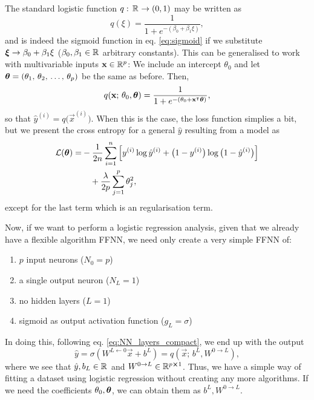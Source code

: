 The standard logistic function $q:\, \RR \to (0,1)$ may be written as 
\begin{equation}\label{eq:logistic_function}
    q(\xi) = \frac{1}{1+e^{-(\beta_0 + \beta_1\xi)}},
\end{equation}
and is indeed the sigmoid function in eq. \eqref{eq:sigmoid} if we substitute $\svec{\xi} \to \beta_0 + \beta_1 \xi$ ($\beta_0, \beta_1 \in \RR$ arbitrary constants). This can be generalised to work with multivariable inputs $\vec{x}\in \RR[p]$: We include an intercept $\theta_0$ and let $\svec{\theta} = (\theta_1, \, \theta_2, \, \dots,\, \theta_p)$ be the same as before. Then,
\begin{equation}\label{eq:logistic_function_fit}
    q(\vec{x};\,\theta_0, \svec{\theta}) = \frac{1}{1+e^{-(\theta_0 + \vec{x}\TT \svec{\theta})}},
\end{equation}
so that $\hat{y}^{(i)} = q\big(\vec{x}^{(i)}\big)$. When this is the case, the loss function simplies a bit, but we present the cross entropy for a general $\hat{y}$ resulting from a model as
\begin{equation}\label{eq:logistic_regression_cost_function}
    \begin{split}
    \mathcal{L}(\svec{\theta}) =& -  \frac{1}{2n}\sum_{i=1}^n \Big[ y^{(i)} \log{\hat{y}^{(i)}} + \big(1-y^{(i)}\big)\log{\big(1-\hat{y}^{(i)}\big)}\Big] \\
    &\quad + \frac{\lambda}{2p}\sum_{j=1}^p \theta_j^2,
    \end{split}
\end{equation}
except for the last term which is an \lnorm[2] regularisation term.

Now, if we want to perform a logistic regression analysis, given that we already have a flexible algorithm FFNN, we need only create a very simple FFNN of: 
\begin{enumerate}[label=*]
    \item $p$ input neurons ($N_0=p$)
    \item a single output neuron ($N_L=1$)
    \item no hidden layers ($L=1$)
    \item sigmoid as output activation function ($g_L=\sigma$)
\end{enumerate}
In doing this, following eq. \eqref{eq:NN_layers_compact}, we end up with the output 
\begin{equation}
    \hat{y} = \sigma(W^{L\leftarrow 0}\vec{x} + b^L) = q(\vec{x};\, b^L, W^{0 \to L}),
\end{equation}
where we see that $\hat{y}, b_L\in \RR$ and $ W^{0\to L} \in \RR[p\cross 1]$. Thus, we have a simple way of fitting a dataset using logistic regression without creating any more algorithms. If we need the coefficients $\theta_0, \svec{\theta}$, we can obtain them as $b^L, W^{0\to L}$.

